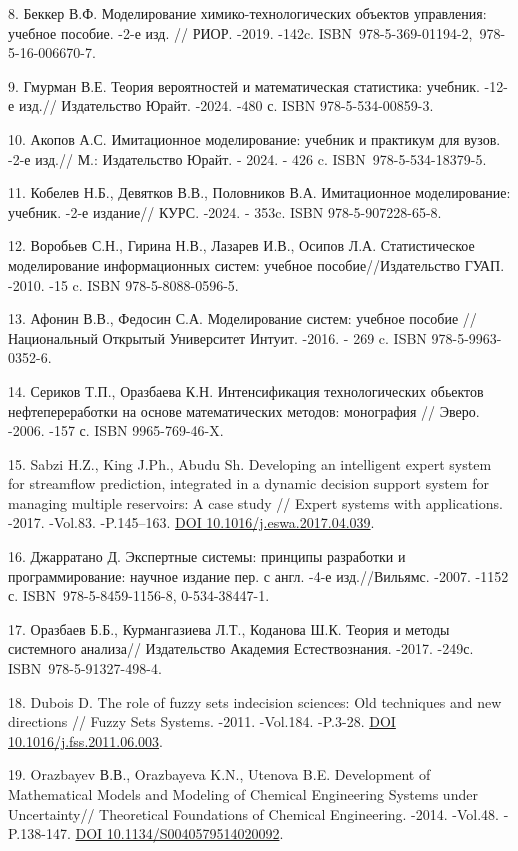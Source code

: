 \begin{refs}
8. Беккер В.Ф. Моделирование химико-технологических объектов управления:
учебное пособие. -2-е изд. // РИОР. -2019. -142c.
ISBN~978-5-369-01194-2,~978-5-16-006670-7.

9. Гмурман В.Е. Теория вероятностей и математическая статистика:
учебник. -12-е изд.// Издательство Юрайт. -2024. -480 с. ISBN
978-5-534-00859-3.

10. Акопов А.С. Имитационное моделирование: учебник и практикум для
вузов. -2-е изд.// М.: Издательство Юрайт. - 2024. - 426 c.
ISBN~978-5-534-18379-5.~

11. Кобелев Н.Б., Девятков В.В., Половников В.А. Имитационное
моделирование: учебник. -2-е издание// КУРС. -2024. - 353c. ISBN
978-5-907228-65-8.

12. Воробьев С.Н., Гирина Н.В., Лазарев И.В., Осипов Л.А. Статистическое
моделирование информационных систем: учебное пособие//Издательство ГУАП.
-2010. -15 c. ISBN 978-5-8088-0596-5.

13. Афонин В.В., Федосин С.А. Моделирование систем: учебное пособие //
Национальный Открытый Университет Интуит. -2016. - 269 c. ISBN
978-5-9963-0352-6.

14. Сериков Т.П., Оразбаева К.Н. Интенсификация технологических обьектов
нефтепереработки на основе математических методов: монография // Эверо.
-2006. -157 с. ISBN 9965-769-46-X.

15. Sabzi H.Z., King J.Ph., Abudu Sh. Developing an intelligent expert
system for streamflow prediction, integrated in a dynamic decision
support system for managing multiple reservoirs: A case study // Expert
systems with applications. -2017. -Vol.83. -P.145--163.
\href{https://doi.org/10.1016/j.eswa.2017.04.039}{DOI
10.1016/j.eswa.2017.04.039}.

16. Джарратано Д. Экспертные системы: принципы разработки и
программирование: научное издание пер. с англ. -4-е изд.//Вильямс.
-2007. -1152 с. ISBN~978-5-8459-1156-8, 0-534-38447-1.

17. Оразбаев Б.Б., Курмангазиева Л.Т., Коданова Ш.К. Теория и методы
системного анализа// Издательство Академия Естествознания. -2017. -249с.
ISBN~978-5-91327-498-4.

18. Dubois D. The role of fuzzy sets indecision sciences: Old techniques
and new directions // Fuzzy Sets Systems. -2011. -Vol.184. -P.3-28.
\href{https://doi.org/10.1016/j.fss.2011.06.003}{DOI
10.1016/j.fss.2011.06.003}.

19. Orazbayev В.В., Orazbayeva K.N., Utenova B.E. Development of
Mathematical Models and Modeling of Chemical Engineering Systems under
Uncertainty// Theoretical Foundations of Chemical Engineering. -2014.
-Vol.48. -P.138-147.
\href{https://doi.org/10.1134/S0040579514020092}{DOI
10.1134/S0040579514020092}.


\end{refs}
